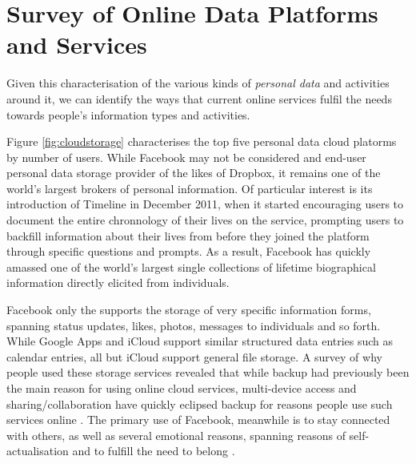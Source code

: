 \documentclass[runningheads,a4paper]{llncs}
\begin{document}
\section{Survey of Online Data Platforms and Services}

Given this characterisation of the various kinds of \emph{personal data} and activities around it, we can identify the ways that current online services fulfil the needs towards people's information types and activities.

Figure \ref{fig:cloudstorage} characterises the top five personal data cloud platorms by number of users. While Facebook may not be considered and end-user personal data storage provider of the likes of Dropbox, it remains one of the world's largest brokers of personal information.  Of particular interest is its introduction of Timeline in December 2011, when it started encouraging users to document the entire chronnology of their lives on the service, prompting users to backfill information about their lives from before they joined the platform through specific questions and prompts.  As a result, Facebook has quickly amassed one of the world's largest single collections of lifetime biographical information directly elicited from individuals.

Facebook only the supports the storage of very specific information forms, spanning status updates, likes, photos, messages to individuals and so forth.  While Google Apps and iCloud support similar structured data entries such as calendar entries, all but iCloud support general file storage.  A survey of why people used these storage services revealed that while backup had previously been the main reason for using online cloud services, multi-device access and sharing/collaboration have quickly eclipsed backup for reasons people use such services online \cite{listitstudy}. The primary use of Facebook, meanwhile is to stay connected with others, as well as several emotional reasons, spanning reasons of self-actualisation and to fulfill the need to belong \cite{why-do-people-facebook}.
\end{document}
